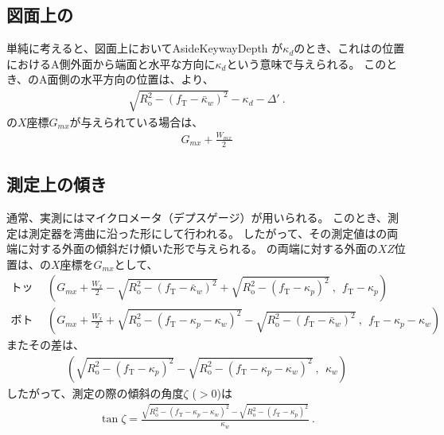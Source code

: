 \subsection{図面上の\KeywayDepth}
単純に考えると、図面上においてAsideKeywayDepth が$\kappa_d$のとき、これは\KeywayCenter の位置におけるA側外面から端面と水平な方向に$\kappa_d$という意味で与えられる。
このとき、\Keyway のA面側の水平方向の位置は、より、
\begin{align*}
  \sqrt{R_\mathrm o^2-(f_\mathrm T-\bar\kappa_w)^2}-\kappa_d-\Delta'\ .
\end{align*}
\KeywayCenter の$X$座標$G_{mx}$が与えられている場合は、
\begin{align*}
  G_{mx}+\frac{W_{mx}}2
\end{align*}


\subsection{測定上の傾き}
通常、実測にはマイクロメータ（デプスゲージ）が用いられる。
このとき、測定は測定器を湾曲に沿った形にして行われる。
したがって、その測定値は\KeywayWidth の両端に対する外面の傾斜だけ傾いた形で与えられる。
\KeywayWidth の両端に対する外面の$XZ$位置は、\KeywayCenter の$X$座標を$G_{mx}$として、
\begin{align*}
  \text{トップ側：}&~~
  \left(
  G_{mx}+\frac{W_x}2
  -\sqrt{R_\mathrm o^2-(f_\mathrm T-\bar\kappa_w)^2}
  +\sqrt{R_\mathrm o^2-(f_\mathrm T-\kappa_p)^2}~,~~
  f_\mathrm T-\kappa_p
  \right)\\
  \text{ボトム側：}&~~
  \left(
  G_{mx}+\frac{W_x}2
  +\sqrt{R_\mathrm o^2-(f_\mathrm T-\kappa_p-\kappa_w)^2}
  -\sqrt{R_\mathrm o^2-(f_\mathrm T-\bar\kappa_w)^2}~,~~
  f_\mathrm T-\kappa_p-\kappa_w
  \right)
\end{align*}
またその差は、
\begin{align*}
  \left(
  \sqrt{R_\mathrm o^2-(f_\mathrm T-\kappa_p)^2}
  -\sqrt{R_\mathrm o^2-(f_\mathrm T-\kappa_p-\kappa_w)^2}~,~~
  \kappa_w
  \right)
\end{align*}
したがって、測定の際の傾斜の角度$\zeta$ ($> 0$)は
\begin{align}
  \label{eq:angleZeta}
  \tan\zeta
  = \frac{\sqrt{R_\mathrm o^2-\left(f_\mathrm T-\kappa_p-\kappa_w\right)^2}
          -\sqrt{R_\mathrm o^2-\left(f_\mathrm T-\kappa_p\right)^2}}
         {\kappa_w}\ .
\end{align}


